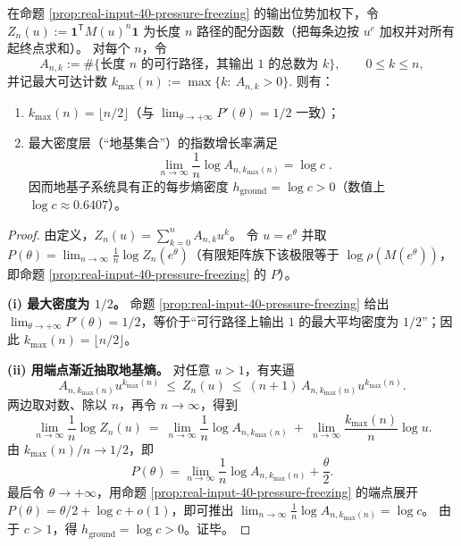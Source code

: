 \begin{corollary}[零温极限的正熵地基：\texorpdfstring{$h_{\mathrm{ground}}=\log c>0$}{h_ground=log c>0}]\label{cor:real-input-40-ground-entropy}
在命题 \ref{prop:real-input-40-pressure-freezing} 的输出位势加权下，令
\(
Z_n(u):=\mathbf{1}^{\mathsf T}M(u)^n\mathbf{1}
\)
为长度 \(n\) 路径的配分函数（把每条边按 \(u^{e}\) 加权并对所有起终点求和）。
对每个 \(n\)，令
\[
A_{n,k}:=\#\{\text{长度 }n\text{ 的可行路径，其输出 }1\text{ 的总数为 }k\},
\qquad 0\le k\le n,
\]
并记最大可达计数
\(
k_{\max}(n):=\max\{k:\ A_{n,k}>0\}.
\)
则有：
\begin{enumerate}
  \item \(k_{\max}(n)=\lfloor n/2\rfloor\)（与 \(\lim_{\theta\to+\infty}P'(\theta)=1/2\) 一致）；
  \item 最大密度层（“地基集合”）的指数增长率满足
  \[
  \boxed{\;
  \lim_{n\to\infty}\frac{1}{n}\log A_{n,k_{\max}(n)}=\log c\; }.
  \]
  因而地基子系统具有正的每步熵密度 \(h_{\mathrm{ground}}=\log c>0\)（数值上 \(\log c\approx 0.6407\)）。
\end{enumerate}
\end{corollary}
\begin{proof}
由定义，\(Z_n(u)=\sum_{k=0}^{n}A_{n,k}u^{k}\)。
令 \(u=e^\theta\) 并取 \(P(\theta)=\lim_{n\to\infty}\frac{1}{n}\log Z_n(e^\theta)\)（有限矩阵族下该极限等于 \(\log\rho(M(e^\theta))\)，即命题 \ref{prop:real-input-40-pressure-freezing} 的 \(P\)）。

\textbf{(i) 最大密度为 \(1/2\)。}
命题 \ref{prop:real-input-40-pressure-freezing} 给出 \(\lim_{\theta\to+\infty}P'(\theta)=1/2\)，等价于“可行路径上输出 \(1\) 的最大平均密度为 \(1/2\)”；因此 \(k_{\max}(n)=\lfloor n/2\rfloor\)。

\textbf{(ii) 用端点渐近抽取地基熵。}
对任意 \(u>1\)，有夹逼
\[
A_{n,k_{\max}(n)}u^{k_{\max}(n)}
\ \le\
Z_n(u)
\ \le\
(n+1)\,A_{n,k_{\max}(n)}u^{k_{\max}(n)}.
\]
两边取对数、除以 \(n\)，再令 \(n\to\infty\)，得到
\[
\lim_{n\to\infty}\frac{1}{n}\log Z_n(u)
\ =\
\lim_{n\to\infty}\frac{1}{n}\log A_{n,k_{\max}(n)}
\ +\
\lim_{n\to\infty}\frac{k_{\max}(n)}{n}\log u.
\]
由 \(k_{\max}(n)/n\to 1/2\)，即
\[
P(\theta)=\lim_{n\to\infty}\frac{1}{n}\log A_{n,k_{\max}(n)}+\frac{\theta}{2}.
\]
最后令 \(\theta\to+\infty\)，用命题 \ref{prop:real-input-40-pressure-freezing} 的端点展开
\(
P(\theta)=\theta/2+\log c+o(1)
\)，即可推出
\(
\lim_{n\to\infty}\frac{1}{n}\log A_{n,k_{\max}(n)}=\log c
\)。
由于 \(c>1\)，得 \(h_{\mathrm{ground}}=\log c>0\)。证毕。
\end{proof}

